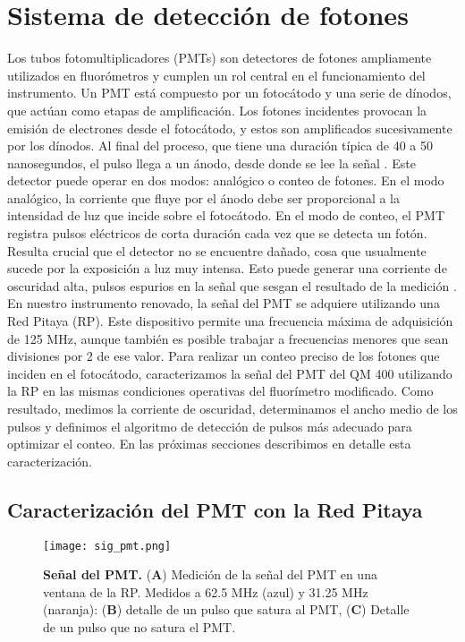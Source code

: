 \section{Sistema de detección de fotones}


 
Los tubos fotomultiplicadores (PMTs) son detectores de fotones ampliamente utilizados en fluorómetros y cumplen un rol central en el funcionamiento del instrumento. 
Un PMT está compuesto por un fotocátodo y una serie de dínodos, que actúan como etapas de amplificación. 
Los fotones incidentes provocan la emisión de electrones desde el fotocátodo, y estos son amplificados sucesivamente por los dínodos. 
Al final del proceso, que tiene una duración típica de 40 a 50 nanosegundos, el pulso llega a un ánodo, desde donde se lee la señal \cite{lakowicz_principles_2006}. 
Este detector puede operar en dos modos: analógico o conteo de fotones. 
En el modo analógico, la corriente que fluye por el ánodo debe ser proporcional a la intensidad de luz que incide sobre el fotocátodo.
En el modo de conteo, el PMT registra pulsos eléctricos de corta duración cada vez que se detecta un fotón. 
Resulta crucial que el detector no se encuentre dañado, cosa que usualmente sucede por la exposición a luz muy intensa. 
Esto puede generar una corriente de oscuridad alta, pulsos espurios en la señal que sesgan el resultado de la medición \cite{lakowicz_principles_2006}.
En nuestro instrumento renovado, la señal del PMT se adquiere utilizando una Red Pitaya (RP). 
Este dispositivo permite una frecuencia máxima de adquisición de 125 MHz, aunque también es posible trabajar a frecuencias menores que sean divisiones por 2 de ese valor. 
Para realizar un conteo preciso de los fotones que inciden en el fotocátodo, caracterizamos la señal del PMT del QM 400 utilizando la RP en las mismas condiciones operativas del fluorímetro modificado.
Como resultado, medimos la corriente de oscuridad, determinamos el ancho medio de los pulsos y definimos el algoritmo de detección de pulsos más adecuado para optimizar el conteo. 
En las próximas secciones describimos en detalle esta caracterización.



\subsection{Caracterización del PMT con la Red Pitaya} \label{sec:caracterizacion_pmt}

\begin{figure}
    \centering
    \texttt{[image: sig\_pmt.png]}
    \caption{\textbf{Señal del PMT.} (\textbf{A}) Medición de la señal del PMT en una ventana de la RP. Medidos a 62.5 MHz (azul) y 31.25 MHz (naranja): (\textbf{B}) detalle de un pulso que satura al PMT, (\textbf{C}) Detalle de un pulso que no satura el PMT.}
    \label{fig:pmt_signal}
\end{figure}

